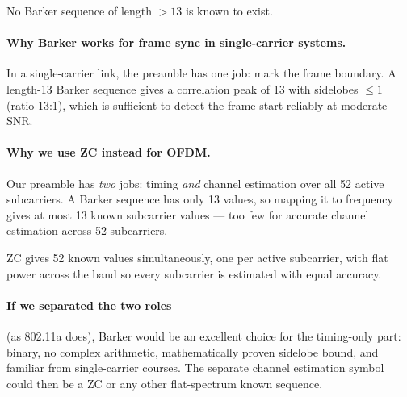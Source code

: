 \documentclass[11pt,a4paper]{article}
\begin{document}
No Barker sequence of length $> 13$ is known to exist.

\paragraph{Why Barker works for frame sync in single-carrier systems.}
In a single-carrier link, the preamble has one job: mark the frame boundary.
A length-13 Barker sequence gives a correlation peak of 13 with sidelobes
$\leq 1$ (ratio 13:1), which is sufficient to detect the frame start
reliably at moderate SNR.

\paragraph{Why we use ZC instead for OFDM.}
Our preamble has \emph{two} jobs: timing \emph{and} channel estimation over
all 52 active subcarriers.  A Barker sequence has only 13 values, so mapping
it to frequency gives at most 13 known subcarrier values --- too few for
accurate channel estimation across 52 subcarriers.

ZC gives 52 known values simultaneously, one per active subcarrier, with
flat power across the band so every subcarrier is estimated with equal
accuracy.

\paragraph{If we separated the two roles} (as 802.11a does), Barker would be
an excellent choice for the timing-only part: binary, no complex arithmetic,
mathematically proven sidelobe bound, and familiar from single-carrier
courses.  The separate channel estimation symbol could then be a ZC or any
other flat-spectrum known sequence.
\end{document}
